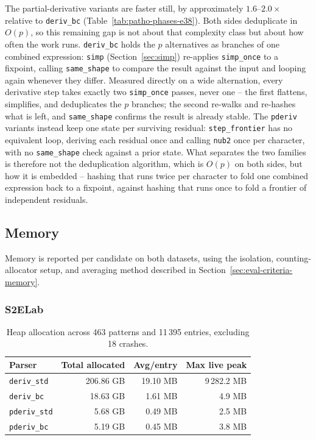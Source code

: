 The partial-derivative variants are faster still,
by approximately $1.6$--$2.0\times$ relative to
\texttt{deriv\_bc} (Table~\ref{tab:patho-phases-e38}).
Both sides deduplicate in $O(p)$, so this remaining
gap is not about that complexity class but about
how often the work runs.
\texttt{deriv\_bc} holds the $p$ alternatives as
branches of one combined expression: \texttt{simp}
(Section~\ref{sec:simp}) re-applies \texttt{simp\_once}
to a fixpoint, calling \texttt{same\_shape} to compare
the result against the input and looping again
whenever they differ.
Measured directly on a wide alternation, every
derivative step takes exactly two \texttt{simp\_once}
passes, never one -- the first flattens, simplifies,
and deduplicates the $p$ branches; the second
re-walks and re-hashes what is left, and
\texttt{same\_shape} confirms the result is already
stable.
The \texttt{pderiv} variants instead keep one state
per surviving residual: \texttt{step\_frontier} has
no equivalent loop, deriving each residual once and
calling \texttt{nub2} once per character, with no
\texttt{same\_shape} check against a prior state.
What separates the two families is therefore not the
deduplication algorithm, which is $O(p)$ on both sides,
but how it is embedded -- hashing that runs twice per
character to fold one combined expression back to a
fixpoint, against hashing that runs once to fold a
frontier of independent residuals.

%
%
%

\clearpage
\subsection{Memory}
\label{sec:eval-memory}

Memory is reported per candidate on both datasets, using the isolation,
counting-allocator setup, and averaging method described in
Section~\ref{sec:eval-criteria-memory}.

%
%
%

\subsubsection{S2ELab}
\label{sec:eval-memory-s2elab}

\begin{table}[H]
\centering
\small
\setlength{\tabcolsep}{4pt}
\begin{tabular*}{\textwidth}{@{\extracolsep{\fill}} lrrr}
\hline
Parser & Total allocated & Avg/entry & Max live peak \\
\hline
\texttt{deriv\_std} & 206.86 GB & 19.10 MB & 9\,282.2 MB \\
\texttt{deriv\_bc}        &  18.63 GB &  1.61 MB &     4.9 MB \\
\texttt{pderiv\_std}      &   5.68 GB &  0.49 MB &     2.5 MB \\
\texttt{pderiv\_bc}       &   5.19 GB &  0.45 MB &     3.8 MB \\
\hline
\end{tabular*}
\caption{Heap allocation across 463 patterns and
11\,395 entries, excluding 18 crashes.}
\label{tab:memory}
\end{table}

